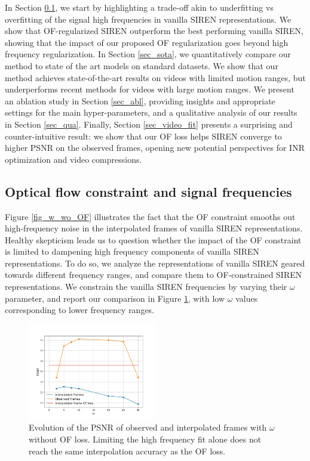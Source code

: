 \documentclass{article}
\begin{document}
In Section \ref{sec_of_high}, we start by highlighting a trade-off akin to
underfitting vs overfitting of the signal high frequencies in vanilla SIREN representations.
We show that OF-regularized SIREN outperform the best performing vanilla SIREN,
showing that the impact of our proposed OF regularization goes beyond high frequency regularization.
In Section \ref{sec_sota}, we quantitatively compare our method to state of the art models on standard datasets.
We show that our method achieves state-of-the-art results on videos with limited motion ranges,
but underperforms recent methods for videos with large motion ranges.
We present an ablation study in Section \ref{sec_abl},
providing insights and appropriate settings for the main hyper-parameters,
and a qualitative analysis of our results in Section \ref{sec_qua}.
Finally, Section \ref{sec_video_fit} presents a surprising and counter-intuitive result:
we show that our OF loss helps SIREN converge to higher PSNR on the observed frames,
opening new potential perspectives for INR optimization and video compressions.

\subsection{Optical flow constraint and signal frequencies}
\label{sec_of_high}
Figure \ref{fig_w_wo_OF} illustrates the fact that the OF constraint smooths
out high-frequency noise in the interpolated frames of vanilla SIREN representations.
Healthy skepticism leads us to question whether the impact of the OF constraint is limited to dampening
high frequency components of vanilla SIREN representations.
To do so, we analyze the representations of vanilla SIREN geared towards different frequency ranges,
and compare them to OF-constrained SIREN representations.
We constrain the vanilla SIREN frequencies by varying their $\omega$ parameter,
and report our comparison in Figure \ref{fig_omega},
with low $\omega$ values corresponding to lower frequency ranges.

\begin{figure}[h]
\centering
\includegraphics[width=0.5\textwidth]{"omega_wo_of"}
\caption{Evolution of the PSNR of observed and interpolated frames with $\omega$ without OF loss.
Limiting the high frequency fit alone does not reach the same interpolation accuracy as the OF loss.}
\label{fig_omega}
\end{figure}
\end{document}
